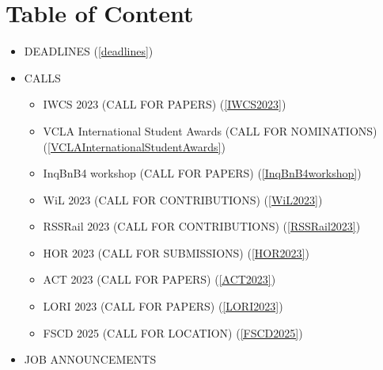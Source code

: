 \documentclass[prodmode,acmtecs]{acmsmall} %
\begin{document}
\section{Table of Content}\begin{itemize}\item DEADLINES (\cref{deadlines}) 
 
\item CALLS 
 
\begin{itemize}\item IWCS 2023 (CALL FOR PAPERS) (\cref{IWCS2023})
\item VCLA International Student Awards (CALL FOR NOMINATIONS) (\cref{VCLAInternationalStudentAwards})
\item InqBnB4 workshop (CALL FOR PAPERS) (\cref{InqBnB4workshop})
\item WiL 2023 (CALL FOR CONTRIBUTIONS) (\cref{WiL2023})
\item RSSRail 2023 (CALL FOR CONTRIBUTIONS) (\cref{RSSRail2023})
\item HOR 2023 (CALL FOR SUBMISSIONS) (\cref{HOR2023})
\item ACT 2023 (CALL FOR PAPERS) (\cref{ACT2023})
\item LORI 2023 (CALL FOR PAPERS) (\cref{LORI2023})
\item FSCD 2025 (CALL FOR LOCATION) (\cref{FSCD2025})
\end{itemize} 
\item JOB ANNOUNCEMENTS 
 

\end{itemize}
\end{document}
